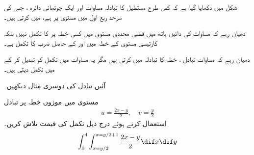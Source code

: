 شکل  میں دکھایا گیا ہے کہ کس طرح  مستطیل  کا تبادلہ مساوات  اور   ایک چوتھائی دائرہ ، جس کی سرحد  ربع اول میں مستوی  پر  ہے، میں کرتی ہیں۔

دھیان رہے کہ مساوات  کی دائیں ہاتھ میں قطبی محددی مستوی میں کسی خطہ پر  کا تکمل نہیں  بلکہ  کارتیسی  مستوی کے خطہ  میں    اور  کے حاصل ضرب کا تکمل ہے۔

دھیان رہے کہ مساوات تبادل ،  خطہ  کا تبادلہ  میں کرتی ہیں مگر یہ مساوات  میں تکمل کو تبدیل کر کے   میں تکمل  دیتی ہیں۔

آئیں تبادل کی دوسری مثال دیکھیں۔

  مستوی   میں موزوں خطہ پر   تبادل  
\begin{align}\label{مساوات_بالکثرت_بدل_مثال}
u=\frac{2x-y}{2},\quad v=\frac{y}{2}
\end{align}
 استعمال کرتے  ہوئے درج ذیل  تکمل کی قیمت تلاش کریں۔
\begin{align*}
\int_0^4\int_{x=y/2}^{x=y/2+1}\frac{2x-y}{2}\dif x\dif y
\end{align*}

